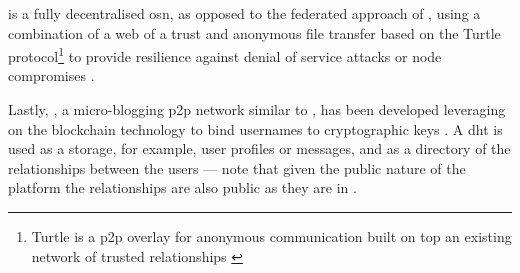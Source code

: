 \RetroShare is a fully decentralised \ac{osn}, as opposed to the federated approach 
of \diaspora, using a combination of a web of a trust and anonymous file transfer 
based on the Turtle protocol\footnote{Turtle is a \ac{p2p} overlay for anonymous 
communication built on top an existing network of trusted relationships \cite{PopescuCT04}} 
to provide resilience against denial of service attacks or node compromises \cite{RetroShare}. 

Lastly, \Twister, a micro-blogging \ac{p2p} network similar to \Twitter, has been 
developed leveraging on the blockchain technology to bind usernames to cryptographic 
keys \cite{Freitas13}. A \ac{dht} is used as a storage, for example, user profiles 
or messages, and as a directory of the relationships between the users --- note 
that given the public nature of the platform the relationships are also public as 
they are in \Twitter.